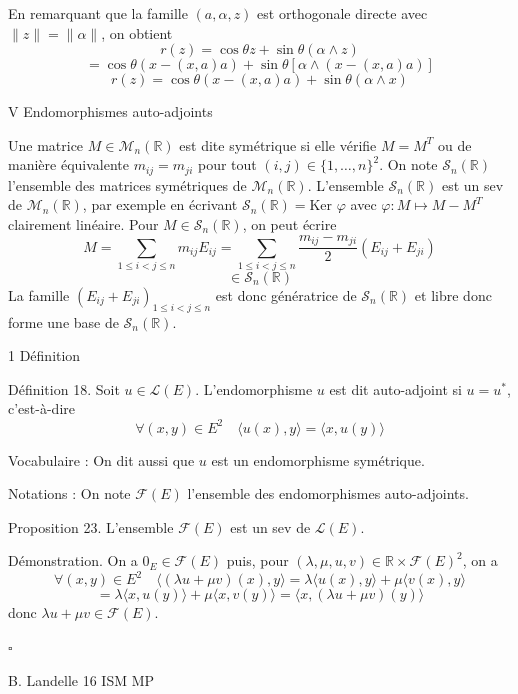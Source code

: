 En remarquant que la famille $(a, \alpha, z)$ est orthogonale directe avec $\|z\| = \| \alpha \|$, on obtient
\[
r(z) = \cos \theta z + \sin \theta (\alpha \wedge z)
\]
\[
= \cos \theta (x - (x,a)a) + \sin \theta [\alpha \wedge (x - (x,a)a)]
\]
\[
r(z) = \cos \theta (x - (x,a)a) + \sin \theta (\alpha \wedge x)
\]

V Endomorphismes auto-adjoints

Une matrice $M \in \mathcal{M}_n(\mathbb{R})$ est dite symétrique si elle vérifie $M = M^T$ ou de manière équivalente $m_{ij} = m_{ji}$ pour tout $(i,j) \in \{1, \dots, n\}^2$. On note $\mathcal{S}_n(\mathbb{R})$ l'ensemble des matrices symétriques de $\mathcal{M}_n(\mathbb{R})$. L'ensemble $\mathcal{S}_n(\mathbb{R})$ est un sev de $\mathcal{M}_n(\mathbb{R})$, par exemple en écrivant $\mathcal{S}_n(\mathbb{R}) = \text{Ker } \varphi$ avec $\varphi : M \mapsto M - M^T$ clairement linéaire. Pour $M \in \mathcal{S}_n(\mathbb{R})$, on peut écrire
\[
M = \sum_{1 \leq i < j \leq n} m_{ij} E_{ij} = \sum_{1 \leq i < j \leq n} \frac{m_{ij} - m_{ji}}{2} (E_{ij} + E_{ji})
\]
\[
\in \mathcal{S}_n(\mathbb{R})
\]
La famille $(E_{ij} + E_{ji})_{1 \leq i < j \leq n}$ est donc génératrice de $\mathcal{S}_n(\mathbb{R})$ et libre donc forme une base de $\mathcal{S}_n(\mathbb{R})$.

1 Définition

Définition 18. Soit $u \in \mathcal{L}(E)$. L'endomorphisme $u$ est dit auto-adjoint si $u = u^*$, c'est-à-dire
\[
\forall (x, y) \in E^2 \quad \langle u(x), y \rangle = \langle x, u(y) \rangle
\]

Vocabulaire : On dit aussi que $u$ est un endomorphisme symétrique.

Notations : On note $\mathcal{F}(E)$ l'ensemble des endomorphismes auto-adjoints.

Proposition 23. L'ensemble $\mathcal{F}(E)$ est un sev de $\mathcal{L}(E)$.

Démonstration. On a $0_{E} \in \mathcal{F}(E)$ puis, pour $(\lambda, \mu, u, v) \in \mathbb{R} \times \mathcal{F}(E)^2$, on a
\[
\forall (x, y) \in E^2 \quad \langle (\lambda u + \mu v)(x), y \rangle = \lambda \langle u(x), y \rangle + \mu \langle v(x), y \rangle
\]
\[
= \lambda \langle x, u(y) \rangle + \mu \langle x, v(y) \rangle = \langle x, (\lambda u + \mu v)(y) \rangle
\]
donc $\lambda u + \mu v \in \mathcal{F}(E)$.

\hfill $\square$

B. Landelle \hspace{2cm} 16 \hspace{2cm} ISM MP

